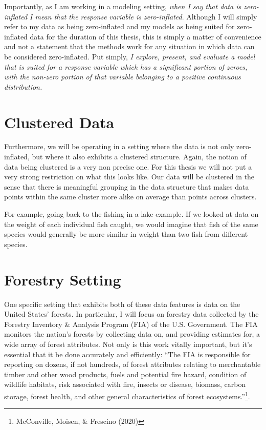 \documentclass[12pt,twoside]{reedthesis}
\begin{document}
Importantly, as I am working in a modeling setting, \emph{when I say that data is zero-inflated I mean that the response variable is zero-inflated}. Although I will simply refer to my data as being zero-inflated and my models as being suited for zero-inflated data for the duration of this thesis, this is simply a matter of convenience and not a statement that the methods work for any situation in which data can be considered zero-inflated. Put simply, \emph{I explore, present, and evaluate a model that is suited for a response variable which has a significant portion of zeroes, with the non-zero portion of that variable belonging to a positive continuous distribution.}

\hypertarget{clustered-data}{%
\section{Clustered Data}\label{clustered-data}}

Furthermore, we will be operating in a setting where the data is not only zero-inflated, but where it also exhibits a clustered structure. Again, the notion of data being clustered is a very non precise one. For this thesis we will not put a very strong restriction on what this looks like. Our data will be clustered in the sense that there is meaningful grouping in the data structure that makes data points within the same cluster more alike on average than points across clusters.
\newline

For example, going back to the fishing in a lake example. If we looked at data on the weight of each individual fish caught, we would imagine that fish of the same species would generally be more similar in weight than two fish from different species.

\hypertarget{forestry-setting}{%
\section{Forestry Setting}\label{forestry-setting}}

One specific setting that exhibits both of these data features is data on the United States' forests. In particular, I will focus on forestry data collected by the Forestry Inventory \& Analysis Program (FIA) of the U.S. Government. The FIA monitors the nation's forests by collecting data on, and providing estimates for, a wide array of forest attributes. Not only is this work vitally important, but it's essential that it be done accurately and efficiently: ``The FIA is responsible for reporting on dozens, if not hundreds, of forest attributes relating to merchantable timber and other wood products, fuels and potential fire hazard, condition of wildlife habitats, risk associated with fire, insects or disease, biomass, carbon storage, forest health, and other general characteristics of forest ecosystems.''\footnote{McConville, Moisen, \& Frescino (2020)}.
\end{document}
